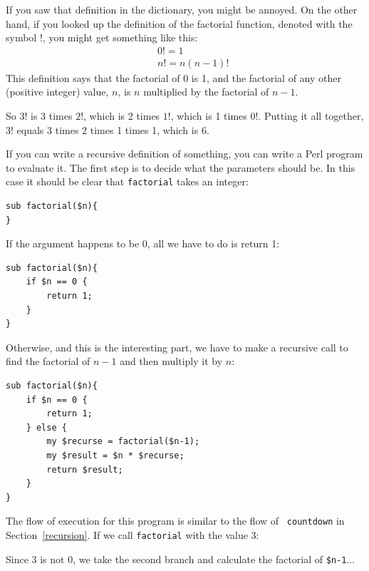 If you saw that definition in the dictionary, you might be annoyed. On
the other hand, if you looked up the definition of the factorial
function, denoted with the symbol $!$, you might get something like
this:
%
\begin{eqnarray*}
&&  0! = 1 \\
&&  n! = n (n-1)!
\end{eqnarray*}
%
This definition says that the factorial of 0 is 1, and the 
factorial of any other (positive integer) value, $n$, is 
$n$ multiplied by the factorial of $n-1$.

So $3!$ is 3 times $2!$, which is 2 times $1!$, which is 1 times
$0!$. Putting it all together, $3!$ equals 3 times 2 times 1 times 1,
which is 6.

If you can write a recursive definition of something, you can
write a Perl program to evaluate it. The first step is to decide
what the parameters should be.  In this case it should be clear
that {\tt factorial} takes an integer:

\begin{verbatim}
sub factorial($n){
}
\end{verbatim}
%
If the argument happens to be 0, all we have to do is return 1:

\begin{verbatim}
sub factorial($n){
    if $n == 0 {
        return 1;
    }
}   
\end{verbatim}
%
Otherwise, and this is the interesting part, we have to make a
recursive call to find the factorial of $n-1$ and then 
multiply it by $n$:

\begin{verbatim}
sub factorial($n){
    if $n == 0 {
        return 1;
    } else {
        my $recurse = factorial($n-1);
        my $result = $n * $recurse;
        return $result;
    }
}
\end{verbatim}
%
The flow of execution for this program is similar to the flow of {\tt
countdown} in Section~\ref{recursion}.  If we call {\tt factorial}
with the value 3:

Since 3 is not 0, we take the second branch and calculate the factorial
of {\tt \$n-1}...

